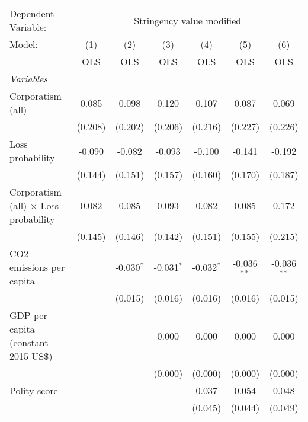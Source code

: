
\begingroup
\centering
\begin{tabular}{lcccccc}
   \toprule
   Dependent Variable: & \multicolumn{6}{c}{Stringency value modified}\\
   Model:                                       & (1)     & (2)          & (3)          & (4)          & (5)           & (6)\\  
                                                &  OLS    & OLS          & OLS          & OLS          & OLS           & OLS\\  
   \midrule
   \emph{Variables}\\
   Corporatism (all)                            & 0.085   & 0.098        & 0.120        & 0.107        & 0.087         & 0.069\\   
                                                & (0.208) & (0.202)      & (0.206)      & (0.216)      & (0.227)       & (0.226)\\   
   Loss probability                             & -0.090  & -0.082       & -0.093       & -0.100       & -0.141        & -0.192\\   
                                                & (0.144) & (0.151)      & (0.157)      & (0.160)      & (0.170)       & (0.187)\\   
   Corporatism (all) $\times$ Loss probability  & 0.082   & 0.085        & 0.093        & 0.082        & 0.085         & 0.172\\   
                                                & (0.145) & (0.146)      & (0.142)      & (0.151)      & (0.155)       & (0.215)\\   
   CO2 emissions per capita                     &         & -0.030$^{*}$ & -0.031$^{*}$ & -0.032$^{*}$ & -0.036$^{**}$ & -0.036$^{**}$\\   
                                                &         & (0.015)      & (0.016)      & (0.016)      & (0.016)       & (0.015)\\   
   GDP per capita (constant 2015 US\$)          &         &              & 0.000        & 0.000        & 0.000         & 0.000\\   
                                                &         &              & (0.000)      & (0.000)      & (0.000)       & (0.000)\\   
   Polity score                                 &         &              &              & 0.037        & 0.054         & 0.048\\   
                                                &         &              &              & (0.045)      & (0.044)       & (0.049)\\   

\end{tabular}
